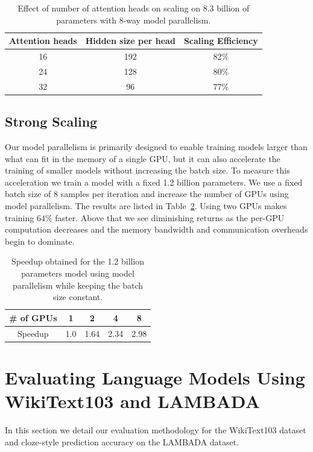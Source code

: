 \documentclass{article}
\begin{document}
\begin{table}[hbt!]
\footnotesize
\begin{center}
\caption{Effect of number of attention heads on scaling on 8.3 billion of parameters with 8-way model parallelism.}
\vskip 0.15in
\label{tab:attn_head_scaling}
\begin{tabular}{c|c|c}
\hline \hline
Attention heads & Hidden size per head & Scaling Efficiency \\ \hline
16 & 192 & 82\% \\
24 & 128 & 80\% \\
32 & 96 & 77\% \\ \hline \hline
\end{tabular}
\end{center}
\vskip -0.1in
\end{table}

\subsection{Strong Scaling}

Our model parallelism is primarily designed to enable training models larger than what can fit in the memory of a single GPU, but it can also accelerate the training of smaller models without increasing the batch size. To measure this acceleration we train a model with a fixed 1.2 billion parameters. We use a fixed batch size of 8 samples per iteration and increase the number of GPUs using model parallelism. The results are listed in Table~\ref{tab:strong_scaling}. Using two GPUs makes training $64\%$ faster. Above that we see diminishing returns as the per-GPU computation decreases and the memory bandwidth and communication overheads begin to dominate.

\begin{table}
\centering
\caption{Speedup obtained for the 1.2 billion parameters model using model parallelism while keeping the batch size constant.}
\vskip 0.15in
\begin{tabular}{c|c|c|c|c}
\hline \hline
\# of GPUs & 1 & 2 & 4 & 8 \\
\hline
Speedup & 1.0 & 1.64 & 2.34 & 2.98 \\
\hline \hline
\end{tabular}
\label{tab:strong_scaling}
\vskip -0.1in
\end{table}

\section{Evaluating Language Models Using WikiText103 and LAMBADA}
\label{app:wikilambada}
In this section we detail our evaluation methodology for the WikiText103 dataset \citep{wikitext} and cloze-style prediction accuracy on the LAMBADA dataset\citep{lambada}.
\end{document}
